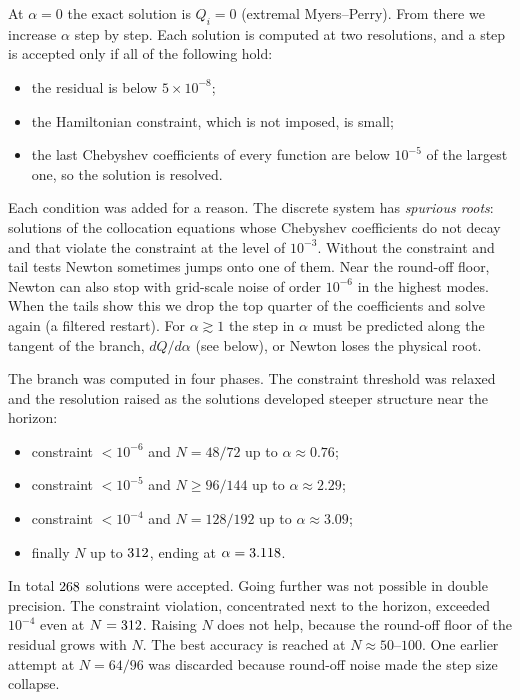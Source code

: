 \documentclass[11pt,a4paper]{article}
\begin{document}
At $\alpha=0$ the exact solution is $Q_i=0$ (extremal Myers--Perry). From there
we increase $\alpha$ step by step. Each solution is computed at two resolutions,
and a step is accepted only if all of the following hold:
\begin{itemize}
\item the residual is below $5\times10^{-8}$;
\item the Hamiltonian constraint, which is not imposed, is small;
\item the last Chebyshev coefficients of every function are below $10^{-5}$ of
the largest one, so the solution is resolved.
\end{itemize}
Each condition was added for a reason. The discrete system has \emph{spurious
roots}: solutions of the collocation equations whose Chebyshev coefficients do
not decay and that violate the constraint at the level of $10^{-3}$. Without the
constraint and tail tests Newton sometimes jumps onto one of them. Near the
round-off floor, Newton can also stop with grid-scale noise of order $10^{-6}$ in
the highest modes. When the tails show this we drop the top quarter of the
coefficients and solve again (a filtered restart). For $\alpha\gtrsim1$ the step
in $\alpha$ must be predicted along the tangent of the branch, $dQ/d\alpha$ (see
below), or Newton loses the physical root.

The branch was computed in four phases. The constraint threshold was relaxed and
the resolution raised as the solutions developed steeper structure near the
horizon:
\begin{itemize}
\item constraint $<10^{-6}$ and $N=48/72$ up to $\alpha\approx0.76$;
\item constraint $<10^{-5}$ and $N\ge96/144$ up to $\alpha\approx2.29$;
\item constraint $<10^{-4}$ and $N=128/192$ up to $\alpha\approx3.09$;
\item finally $N$ up to $312$, ending at $\alpha=3.118$.
\end{itemize}
In total $268$ solutions were accepted. Going further was not possible
in double precision. The constraint violation, concentrated next to the horizon,
exceeded $10^{-4}$ even at $N=312$. Raising $N$ does not help, because
the round-off floor of the residual grows with $N$. The best accuracy is reached
at $N\approx50$--$100$. One earlier attempt at $N=64/96$ was discarded because
round-off noise made the step size collapse.
\end{document}
